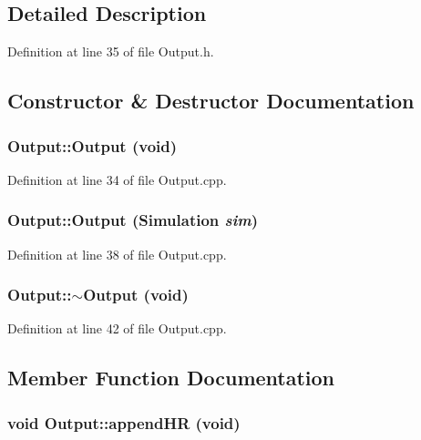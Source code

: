 \subsection{Detailed Description}


Definition at line 35 of file Output.h.



\subsection{Constructor \& Destructor Documentation}
\subsubsection[{Output}]{\setlength{\rightskip}{0pt plus 5cm}Output::Output (void)}\label{classOutput_a428c663520336477a12f1a33504eb067}


Definition at line 34 of file Output.cpp.

\subsubsection[{Output}]{\setlength{\rightskip}{0pt plus 5cm}Output::Output ({\bf Simulation} {\em sim})}\label{classOutput_aebd7037654639cea281a35d81ca8aaa5}


Definition at line 38 of file Output.cpp.

\subsubsection[{$\sim$Output}]{\setlength{\rightskip}{0pt plus 5cm}Output::$\sim$Output (void)}\label{classOutput_a61d0840daf98bea49e4dc471f235eeab}


Definition at line 42 of file Output.cpp.



\subsection{Member Function Documentation}
\subsubsection[{appendHR}]{\setlength{\rightskip}{0pt plus 5cm}void Output::appendHR (void)}\label{classOutput_a71850dc1d6b1910f23554a658dbdaf43}


